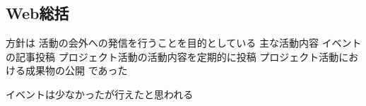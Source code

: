 \subsection*{Web総括}

方針は
    活動の会外への発信を行うことを目的としている
    主な活動内容
    イベントの記事投稿
    プロジェクト活動の活動内容を定期的に投稿
    プロジェクト活動における成果物の公開
であった

イベントは少なかったが行えたと思われる
